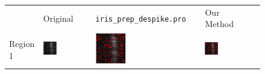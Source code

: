 \documentclass[10pt,letterpaper]{article}
\begin{document}
			
				\begin{figure}[h!]
					
					\centering
					\renewcommand{\arraystretch}{0}
					\setlength{\tabcolsep}{0pt}
					\begin{tabular}{m{} m{0.3\textwidth} m{} m{} @{}m{0pt}@{}}
						& \centering Original & \centering \texttt{iris\_prep\_despike.pro} & \centering Our Method & \\[5mm]
						Region 1 & \includegraphics[width=0.3\textwidth]{fig/orig_1} & \includegraphics[width=0.3\textwidth]{fig/despike_1} & \includegraphics[width=0.3\textwidth]{fig/dspk_1} & \\

\end{tabular}
\end{figure}
\end{document}
